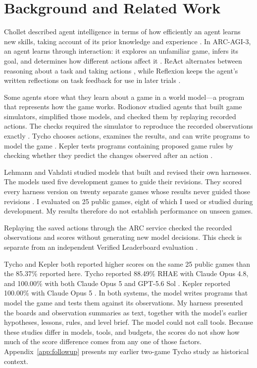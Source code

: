 \section{Background and Related Work}\label{sec:background}
Chollet described agent intelligence in terms of how efficiently an agent learns new skills, taking account of its prior knowledge and experience \citep{chollet2019measure}. In ARC-AGI-3, an agent learns through interaction: it explores an unfamiliar game, infers its goal, and determines how different actions affect it \citep{arc2026technical}. ReAct alternates between reasoning about a task and taking actions \citep{yao2023react}, while Reflexion keeps the agent's written reflections on task feedback for use in later trials \citep{shinn2023reflexion}.

Some agents store what they learn about a game in a world model—a program that represents how the game works. Rodionov studied agents that built game simulators, simplified those models, and checked them by replaying recorded actions. The checks required the simulator to reproduce the recorded observations exactly \citep{rodionov2026worldmodels,rodionov2026components}. Tycho chooses actions, examines the results, and can write programs to model the game \citep{lehmann2026tycho}. Kepler tests programs containing proposed game rules by checking whether they predict the changes observed after an action \citep{wu2026kepler}.

Lehmann and Vahdati studied models that built and revised their own harnesses. The models used five development games to guide their revisions. They scored every harness version on twenty separate games whose results never guided those revisions \citep{lehmann2026harness}. I evaluated on 25 public games, eight of which I used or studied during development. My results therefore do not establish performance on unseen games.

Replaying the saved actions through the ARC service checked the recorded observations and scores without generating new model decisions. This check is separate from an independent Verified Leaderboard evaluation \citep{arc2026policy}.

Tycho and Kepler both reported higher scores on the same 25 public games than the 85.37\% reported here. Tycho reported 88.49\% RHAE with Claude Opus 4.8, and 100.00\% with both Claude Opus 5 and GPT-5.6 Sol \citep{lehmann2026tycho}. Kepler reported 100.00\% with Claude Opus 5 \citep{wu2026kepler}. In both systems, the model writes programs that model the game and tests them against its observations. My harness presented the boards and observation summaries as text, together with the model’s earlier hypotheses, lessons, rules, and level brief. The model could not call tools. Because these studies differ in models, tools, and budgets, the scores do not show how much of the score difference comes from any one of those factors. Appendix~\ref{app:followup} presents my earlier two-game Tycho study as historical context.

